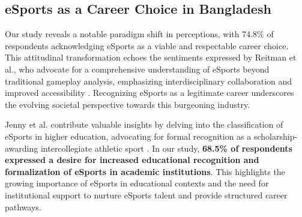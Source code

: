 \documentclass[manuscript,screen,review,anonymous]{acmart}
\begin{document}

\subsection{eSports as a Career Choice in Bangladesh}

Our study reveals a notable paradigm shift in perceptions, with 74.8\% of respondents acknowledging eSports as a viable and respectable career choice. This attitudinal transformation echoes the sentiments expressed by Reitman et al., who advocate for a comprehensive understanding of eSports beyond traditional gameplay analysis, emphasizing interdisciplinary collaboration and improved accessibility \cite{a19}. Recognizing eSports as a legitimate career underscores the evolving societal perspective towards this burgeoning industry.

Jenny et al. contribute valuable insights by delving into the classification of eSports in higher education, advocating for formal recognition as a scholarship-awarding intercollegiate athletic sport \cite{a6}. In our study, \textbf{68.5\% of respondents expressed a desire for increased educational recognition and formalization of eSports in academic institutions}. This highlights the growing importance of eSports in educational contexts and the need for institutional support to nurture eSports talent and provide structured career pathways.
\end{document}
